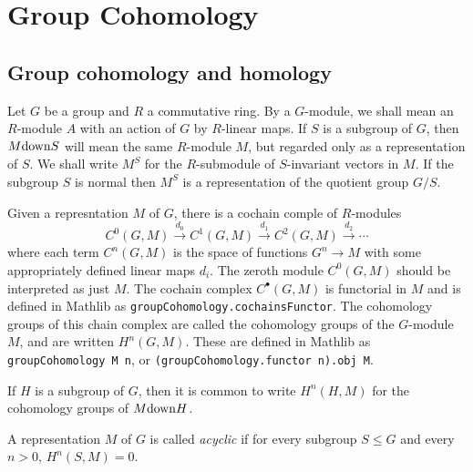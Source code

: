 %


\chapter{Group Cohomology}

\section{Group cohomology and homology}

Let $G$ be a group and $R$ a commutative ring.
By a $G$-module, we shall mean an $R$-module $A$ with an action of $G$ by $R$-linear maps.
If $S$ is a subgroup of $G$, then $M \mathrm{down} S$ will mean the same $R$-module $M$, but regarded only as a
representation of $S$.
We shall write $M^S$ for the $R$-submodule of $S$-invariant vectors in $M$.
If the subgroup $S$ is normal then $M^S$ is a representation of the quotient group $G/S$.

Given a represntation $M$ of $G$, there is a cochain comple of $R$-modules
\[
	C^0(G,M) \stackrel{d_0}\to C^1(G,M)  \stackrel{d_1}\to C^2(G,M)  \stackrel{d_2}\to \cdots
\]
where each term $C^n(G,M)$ is the space of functions $G^n \to M$ with some appropriately defined
linear maps $d_i$.
The zeroth module $C^0(G,M)$ should be interpreted as just $M$.
The cochain complex $C^\bullet(G,M)$ is functorial in $M$ and is defined in Mathlib as
\texttt{groupCohomology.cochainsFunctor}.
The cohomology groups of this chain complex are called the cohomology groups of the
$G$-module $M$, and are written $H^n(G,M)$. These are defined in Mathlib as
\texttt{groupCohomology M n}, or \texttt{(groupCohomology.functor n).obj M}.

If $H$ is a subgroup of $G$, then it is common to write $H^n(H,M)$ for the
cohomology groups of $M \mathrm{down} H$.

\begin{definition}
	\label{def:acyclic}
	\leanok
	A representation $M$ of $G$ is called \emph{acyclic} if for every subgroup $S \le G$
	and every $n > 0$, $H^n(S,M) = 0$.
\end{definition}


